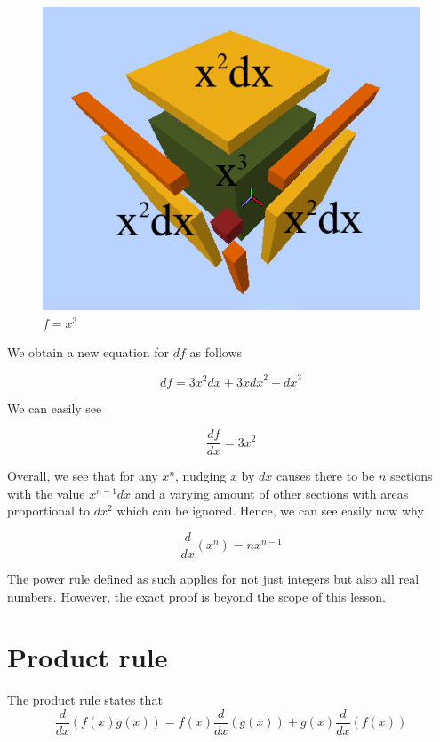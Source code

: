 \documentclass[a4paper,12pt,oneside]{book}
\begin{document}
\begin{figure}[H]
    \begin{center}
        \includegraphics[scale=0.75]{img/zayan/pr2.png}
        \caption{$f=x^3$}
        \label{fig:pr2}
    \end{center}
\end{figure}

\noindent We obtain a new equation for $df$ as follows

$$df = 3x^2dx+3x{dx}^2+{dx}^3$$

\noindent We can easily see

$$\frac{df}{dx}=3x^2$$

\noindent Overall, we see that for any $x^n$, nudging $x$ by $dx$ causes there to be $n$ sections with the value $x^{n-1}dx$ and a varying amount of other sections with areas proportional to $dx^2$ which can be ignored. Hence, we can see easily now why

$$\frac{d}{dx}(x^n)=nx^{n-1}$$

\noindent The power rule defined as such applies for not just integers but also all real numbers. However, the exact proof is beyond the scope of this lesson.

\section{Product rule}

The product rule states that
$$\frac{d}{dx}(f(x)g(x))=f(x)\frac{d}{dx}(g(x))+g(x)\frac{d}{dx}(f(x))$$
\end{document}

